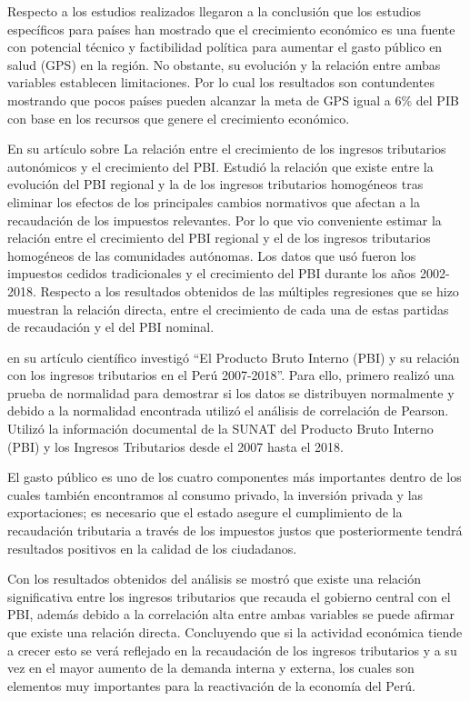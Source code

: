 \documentclass[
  letterpaper,
]{article}
\begin{document}
Respecto a los estudios realizados llegaron a la conclusión que los
estudios específicos para países han mostrado que el crecimiento
económico es una fuente con potencial técnico y factibilidad política
para aumentar el gasto público en salud (GPS) en la región. No obstante,
su evolución y la relación entre ambas variables establecen
limitaciones. Por lo cual los resultados son contundentes mostrando que
pocos países pueden alcanzar la meta de GPS igual a 6\% del PIB con base
en los recursos que genere el crecimiento económico.

\textcite{de_la_fuente_relacion_2021} En su artículo sobre La relación
entre el crecimiento de los ingresos tributarios autonómicos y el
crecimiento del PBI. Estudió la relación que existe entre la evolución
del PBI regional y la de los ingresos tributarios homogéneos tras
eliminar los efectos de los principales cambios normativos que afectan a
la recaudación de los impuestos relevantes. Por lo que vio conveniente
estimar la relación entre el crecimiento del PBI regional y el de los
ingresos tributarios homogéneos de las comunidades autónomas. Los datos
que usó fueron los impuestos cedidos tradicionales y el crecimiento del
PBI durante los años 2002-2018. Respecto a los resultados obtenidos de
las múltiples regresiones que se hizo muestran la relación directa,
entre el crecimiento de cada una de estas partidas de recaudación y el
del PBI nominal.

\textcite{fernandez_producto_2019} en su artículo científico investigó
``El Producto Bruto Interno (PBI) y su relación con los ingresos
tributarios en el Perú 2007-2018''. Para ello, primero realizó una
prueba de normalidad para demostrar si los datos se distribuyen
normalmente y debido a la normalidad encontrada utilizó el análisis de
correlación de Pearson. Utilizó la información documental de la SUNAT
del Producto Bruto Interno (PBI) y los Ingresos Tributarios desde el
2007 hasta el 2018.

El gasto público es uno de los cuatro componentes más importantes dentro
de los cuales también encontramos al consumo privado, la inversión
privada y las exportaciones; es necesario que el estado asegure el
cumplimiento de la recaudación tributaria a través de los impuestos
justos que posteriormente tendrá resultados positivos en la calidad de
los ciudadanos.

Con los resultados obtenidos del análisis se mostró que existe una
relación significativa entre los ingresos tributarios que recauda el
gobierno central con el PBI, además debido a la correlación alta entre
ambas variables se puede afirmar que existe una relación directa.
Concluyendo que si la actividad económica tiende a crecer esto se verá
reflejado en la recaudación de los ingresos tributarios y a su vez en el
mayor aumento de la demanda interna y externa, los cuales son elementos
muy importantes para la reactivación de la economía del Perú.
\end{document}
